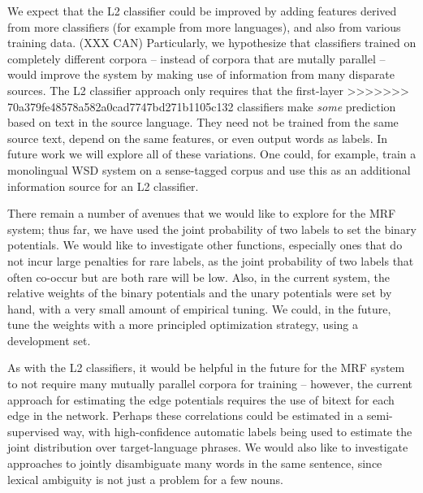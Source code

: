 \documentclass[11pt,letterpaper]{article}
\begin{document}
We expect that the L2 classifier could be improved by adding features
derived from more classifiers (for example from more languages), and also from various training data.
(XXX CAN)
Particularly, we hypothesize that classifiers trained on
completely different corpora -- instead of corpora that are mutally parallel --
would improve the system by making use of information from many disparate
sources. The L2 classifier approach only requires that the first-layer
>>>>>>> 70a379fe48578a582a0cad7747bd271b1105c132
classifiers make \emph{some} prediction based on text in the source language.
They need not be trained from the same source text, depend on the same
features, or even output words as labels. In future work we will explore
all of these variations. One could, for example, train a monolingual WSD system
on a sense-tagged corpus and use this as an additional information source for
an L2 classifier.


There remain a number of avenues that we would like to explore for the MRF
system; thus far, we have used the joint probability of two labels to set the
binary potentials. We would like to investigate other functions, especially
ones that do not incur large penalties for rare labels, as the joint
probability of two labels that often co-occur but are both rare will be low.
Also, in the current system, the relative weights of the binary potentials and
the unary potentials were set by hand, with a very small amount of empirical
tuning. We could, in the future, tune the weights with a more principled
optimization strategy, using a development set.

As with the L2 classifiers, it would be helpful in the future for the MRF
system to not require many mutually parallel corpora for training -- however,
the current approach for estimating the edge potentials requires the use of
bitext for each edge in the network. Perhaps these correlations could be
estimated in a semi-supervised way, with high-confidence automatic labels being
used to estimate the joint distribution over target-language phrases. We would
also like to investigate approaches to jointly disambiguate many words in the
same sentence, since lexical ambiguity is not just a problem for a few nouns.
\end{document}
